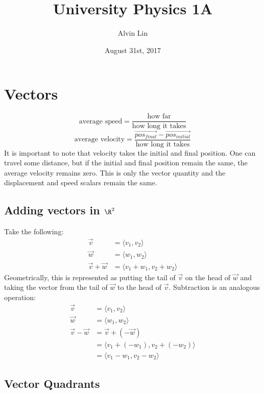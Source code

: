 \documentclass{math}
\title{University Physics 1A}
\author{Alvin Lin}
\date{August 31st, 2017}
\begin{document}
\maketitle

\section*{Vectors}
\[ \textrm{average speed} =
  \frac{\textrm{how far}}{\textrm{how long it takes}} \]
\[ \textrm{average velocity} =
  \frac{\vec{pos_{final}}-\vec{pos_{initial}}}
  {\textrm{how long it takes}} \]
It is important to note that velocity takes the initial and final
position. One can travel some distance, but if the initial and final
position remain the same, the average velocity remains zero. This is
only the vector quantity and the displacement and speed scalars remain
the same.

\subsection*{Adding vectors in \( \R^{2} \)}
Take the following:
\begin{align*}
  \vec{v} &= \langle v_{1},v_{2}\rangle \\
  \vec{w} &= \langle w_{1},w_{2}\rangle \\
  \vec{v}+\vec{w} &= \langle v_{1}+w_{1},v_{2}+w_{2}\rangle
\end{align*}
Geometrically, this is represented as putting the tail of
\( \vec{v} \) on the head of \( \vec{w} \) and taking the vector
from the tail of \( \vec{w} \) to the head of \( \vec{v} \).
Subtraction is an analogous operation:
\begin{align*}
  \vec{v} &= \langle v_{1},v_{2}\rangle \\
  \vec{w} &= \langle w_{1},w_{2}\rangle \\
  \vec{v}-\vec{w} &= \vec{v}+(-\vec{w}) \\
  &= \langle v_{1}+(-w_{1}),v_{2}+(-w_{2})\rangle \\
  &= \langle v_{1}-w_{1},v_{2}-w_{2}\rangle
\end{align*}

\subsection*{Vector Quadrants}
\begin{center}
\end{center}
\end{document}
